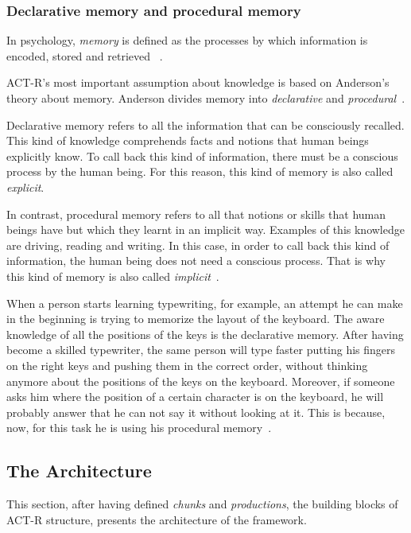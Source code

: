   

		\subsubsection{Declarative memory and procedural memory}
		In psychology, \emph{memory} is defined as the processes by which information is encoded, stored and retrieved ~\cite{baddeley2009memory}. 
	
		\mbox{ACT-R's} most important assumption about knowledge is based on Anderson's theory about memory. 
		Anderson divides memory into \emph{declarative} and \emph{procedural}~\cite{Anderson04anintegrated}. 
	
		Declarative memory refers to all the information that can be consciously recalled. This kind of knowledge comprehends facts and notions that human beings explicitly know. To call back this kind of information, there must be a conscious process by the human being. For this reason, this kind of memory is also called \emph{explicit}.
	
		In contrast, procedural memory refers to all that notions or skills that human beings have but which they learnt in an implicit way. Examples of this knowledge are driving, reading and writing. In this case, in order to call back this kind of information, the human being does not need a conscious process. That is why this kind of memory is also called \emph{implicit}~\cite{anderson1976language}. 
			
		When a person starts learning typewriting, for example, an attempt he can make in the beginning is trying to memorize the layout of the keyboard. The aware knowledge of all the positions of the keys is the declarative memory. After having become a skilled typewriter, the same person will type faster putting his fingers on the right keys and pushing them in the correct order, without thinking anymore about the positions of the keys on the keyboard. Moreover, if someone asks him where the position of a certain character is on the keyboard, he will probably answer that he can not say it without looking at it. This is because, now, for this task he is using his procedural memory~\cite{anderson1993rules}.
	
	\subsection{The Architecture}
		 This section, after having defined \emph{chunks} and \emph{productions}, the building blocks of ACT-R structure, presents the architecture of the framework.

